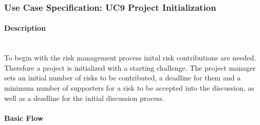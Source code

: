 
\newpage
\subsubsection{Use Case Specification: \ac{UC}9 Project Initialization}
\label{sec:domainBbj}

\paragraph*{Description}\mbox{}\\
To begin with the risk management process inital risk contributions are needed. Therefore a project is initialized with a starting challenge. The project manager sets an initial number of risks to be contributed, a deadline for them and a minimum number of supporters for a risk to be accepted into the discussion, as well as a deadline for the initial discussion process.

\paragraph*{Basic Flow} \mbox{}\\

